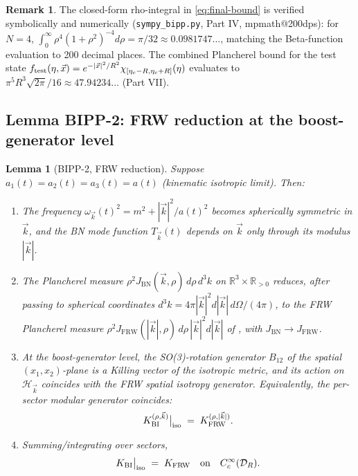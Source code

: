 \documentclass[11pt,a4paper]{article}
\newtheorem{lemma}[theorem]{Lemma}
\theoremstyle{definition}
\newtheorem{remark}[theorem]{Remark}
\newcommand{\R}{\mathbb{R}}
\newcommand{\cH}{\mathcal{H}}
\newcommand{\cD}{\mathcal{D}}
\newcommand{\BI}{\mathrm{BI}}
\newcommand{\FRW}{\mathrm{FRW}}
\newcommand{\BN}{\mathrm{BN}}
\begin{document}
\begin{remark}\label{rem:numerics-BIPP1}
The closed-form rho-integral in \eqref{eq:final-bound} is verified
symbolically and numerically (\texttt{sympy\_bipp.py}, Part IV,
mpmath@200dps): for $N=4$, $\int_0^\infty\rho^4(1+\rho^2)^{-4}d\rho
=\pi/32\approx 0.0981747\ldots$, matching the Beta-function evaluation
to 200 decimal places. The combined Plancherel bound for the test
state $f_{\rm test}(\eta,\vec x)= e^{-|\vec x|^2/R^2}\chi_{[\eta_c-R,\eta_c+R]}(\eta)$
evaluates to $\pi^5 R^3\sqrt{2\pi}/16\approx 47.94234\ldots$ (Part VII).
\end{remark}

\subsection{Lemma BIPP-2: FRW reduction at the boost-generator level}

\begin{lemma}[BIPP-2, FRW reduction]\label{lem:BIPP-2}
Suppose $a_1(t)=a_2(t)=a_3(t)=a(t)$ (kinematic isotropic limit). Then:
\begin{enumerate}\setlength\itemsep{2pt}
\item[(a)] The frequency $\omega_{\vec k}(t)^2 = m^2+|\vec k|^2/a(t)^2$
becomes spherically symmetric in $\vec k$, and the BN mode function
$T_{\vec k}(t)$ depends on $\vec k$ only through its modulus
$|\vec k|$.
\item[(b)] The Plancherel measure $\rho^2 J_\BN(\vec k,\rho)\,d\rho\,d^3 k$
on $\R^3\times\R_{>0}$ reduces, after passing to spherical coordinates
$d^3 k = 4\pi |\vec k|^2 d|\vec k|\,d\Omega/(4\pi)$, to the FRW
Plancherel measure
$\rho^2 J_\FRW(|\vec k|,\rho)\,d\rho\,|\vec k|^2 d|\vec k|$ of
\cite[Thm.~3.5]{ECI-FRW-note}, with $J_\BN \to J_\FRW$.
\item[(c)] At the boost-generator level, the SO(3)-rotation generator
$B_{12}$ of the spatial $(x_1,x_2)$-plane is a Killing vector of the
isotropic metric, and its action on $\cH_{\vec k}$ coincides with the
FRW spatial isotropy generator. Equivalently, the per-sector modular
generator coincides:
\begin{equation}\label{eq:K-iso-equality}
K_\BI^{(\rho,\vec k)}\big|_{\rm iso} \;=\; K_\FRW^{(\rho,|\vec k|)}.
\end{equation}
\item[(d)] Summing/integrating over sectors,
\begin{equation}
K_\BI\big|_{\rm iso} \;=\; K_\FRW
\quad\text{on}\quad C_c^\infty(\cD_R).
\end{equation}
\end{enumerate}
\end{lemma}
\end{document}
